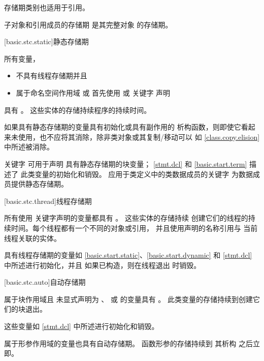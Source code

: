 \pnum
存储期类别也适用于引用。

\pnum
{}%
子对象和引用成员的存储期
是其完整对象 的存储期。
%

[basic.stc.static]{静态存储期}

\pnum
所有变量，
\begin{itemize}
\item
不具有线程存储期并且
\item
属于命名空间作用域 或
首先使用  或  关键字 声明
\end{itemize}
具有 。
这些实体的存储持续程序的持续时间。

\pnum
如果具有静态存储期的变量具有初始化或具有副作用的
析构函数，则即使它看起来未使用，也不应将其消除，除非类对象或其复制/移动可以
如 \ref{class.copy.elision} 中所述被消除。

\pnum
\begin{note}
%
关键字  可用于声明
具有静态存储期的块变量；
\ref{stmt.dcl} 和 \ref{basic.start.term} 描述了
此类变量的初始化和销毁。
%
应用于类定义中的类数据成员的关键字 
为数据成员提供静态存储期。
\end{note}

[basic.stc.thread]{线程存储期}

\pnum
所有使用  关键字声明的变量都具有
。
这些实体的存储持续
创建它们的线程的持续时间。每个线程都有一个不同的对象或引用，
并且使用声明的名称引用与
当前线程关联的实体。

\pnum
\begin{note}
具有线程存储期的变量如
\ref{basic.start.static}、\ref{basic.start.dynamic} 和 \ref{stmt.dcl} 中所述进行初始化，并且
如果已构造，则在线程退出 时销毁。
\end{note}

[basic.stc.auto]{自动存储期}

\pnum
{}%
属于块作用域且
未显式声明为 、 或  的变量具有
。
此类变量的存储持续到创建它们的块退出。
\begin{note}
这些变量如 \ref{stmt.dcl} 中所述进行初始化和销毁。
\end{note}
属于形参作用域的变量也具有自动存储期。
函数形参的存储持续到
其析构 之后立即。

